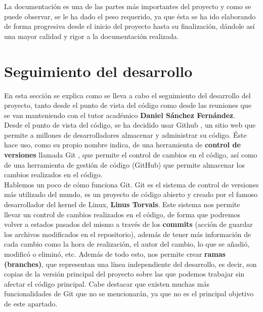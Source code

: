 La documentación es una de las partes más importantes del proyecto y como se puede observar,
se le ha dado el peso requerido, ya que ésta se ha ido elaborando de forma progresiva desde
el inicio del proyecto hasta su finalización, dándole así una mayor calidad y rigor a la
documentación realizada.

\section{Seguimiento del desarrollo} \label{sec:tracking}
En esta sección se explica como se lleva a cabo el seguimiento del desarrollo del proyecto,
tanto desde el punto de vista del código como desde las reuniones que se van manteniendo
con el tutor académico \textbf{Daniel Sánchez Fernández}.\\

Desde el punto de vista del código, se ha decidido usar Github \cite{github}, un sitio web
que permite a millones de desarrolladores almacenar y administrar su código. Éste hace uso,
como su propio nombre indica, de una herramienta de \textbf{control de versiones} llamada
Git \cite{git}, que permite el control de cambios en el código, así como de una herramienta
de gestión de código (GitHub) que permite almacenar los cambios realizados en el código.\\

Hablemos un poco de cómo funciona Git. Git es el sistema de control de versiones más
utilizado del mundo, es un proyecto de código abierto y creado por el famoso desarrollador
del kernel de Linux, \textbf{Linus Torvals}. Este sistema nos permite llevar un control de
cambios realizados en el código, de forma que podremos volver a estados pasados del mismo
a través de los \textbf{commits} (acción de guardar los archivos modificados en el
repositorio), además de tener más información de cada cambio como la hora de realización,
el autor del cambio, lo que se añadió, modificó o eliminó, etc. Además de todo esto, nos
permite crear \textbf{ramas (branches)}, que representan una línea independiente del
desarrollo, es decir, son copias de la versión principal del proyecto sobre las que podemos
trabajar sin afectar el código principal. Cabe destacar que existen muchas más
funcionalidades de Git que no se mencionarán, ya que no es el principal objetivo de este
apartado.\\

